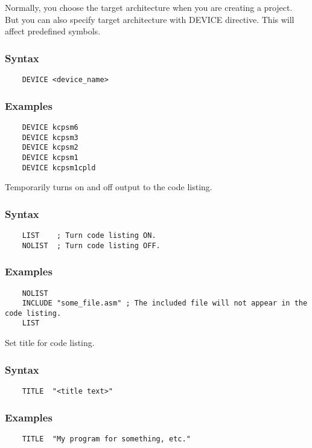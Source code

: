     Normally, you choose the target architecture when you are creating a project. But you can also specify target architecture with DEVICE directive. This will affect predefined symbols.

    \subsubsection{Syntax}
        \verb'    DEVICE <device_name>'

    \subsubsection{Examples}
        \verb'    DEVICE kcpsm6'\\
        \verb'    DEVICE kcpsm3'\\
        \verb'    DEVICE kcpsm2'\\
        \verb'    DEVICE kcpsm1'\\
        \verb'    DEVICE kcpsm1cpld'

    Temporarily turns on and off output to the code listing.

    \subsubsection{Syntax}
        \verb'    LIST    ; Turn code listing ON.'\\
        \verb'    NOLIST  ; Turn code listing OFF.'

    \subsubsection{Examples}
        \verb'    NOLIST'\\
        \verb'    INCLUDE "some_file.asm" ; The included file will not appear in the code listing.'\\
        \verb'    LIST'

    Set title for code listing.

    \subsubsection{Syntax}
        \verb'    TITLE  "<title text>"'

    \subsubsection{Examples}
        \verb'    TITLE  "My program for something, etc."'

